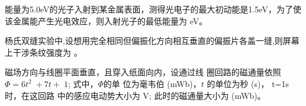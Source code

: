 \documentclass{njustexam}
\begin{document}



\begin{problem}
能量为5.0eV的光子入射到某金属表面，测得光电子的最大初动能是1.5eV，为了使该金属能产生光电效应，则入射光子的最低能量为 eV。                                              
\end{problem}

\begin{problem}
杨氏双缝实验中,设想用完全相同但偏振化方向相互垂直的偏振片各盖一缝,则屏幕上干涉条纹强度为 。 
\end{problem}


\begin{problem}
  磁场方向与线圈平面垂直，且穿入纸面向内，设通过线
  圈回路的磁通量依照$\Phi = 6t^2 + 7t + 1$; 式中，$\Phi$的单
位为毫韦伯 (mWb)，$t$ 的单位为秒 (s)，
t=1s 时，在这回路
中的感应电动势大小为 V; 此时的磁通量大小为 (mWb)。
\end{problem}




\end{document}
